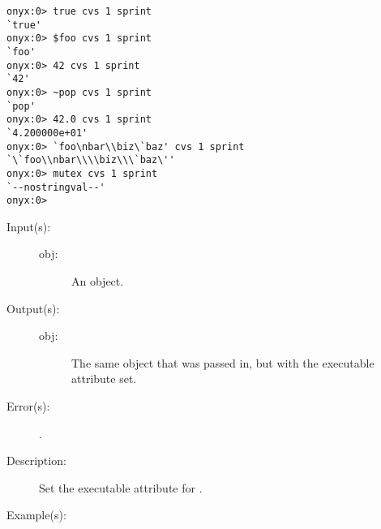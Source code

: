 \begin{description}
\begin{description}
\begin{verbatim}
onyx:0> true cvs 1 sprint
`true'
onyx:0> $foo cvs 1 sprint
`foo'
onyx:0> 42 cvs 1 sprint
`42'
onyx:0> ~pop cvs 1 sprint
`pop'
onyx:0> 42.0 cvs 1 sprint
`4.200000e+01'
onyx:0> `foo\nbar\\biz\`baz' cvs 1 sprint
`\`foo\\nbar\\\\biz\\\`baz\''
onyx:0> mutex cvs 1 sprint
`--nostringval--'
onyx:0>
		\end{verbatim}
	\end{description}
\label{systemdict:cvx}
\item[{\onyxop{obj}{cvx}{obj}}: ]
	\begin{description}\item[]
	\item[Input(s): ]
		\begin{description}\item[]
		\item[obj: ]
			An object.
		\end{description}
	\item[Output(s): ]
		\begin{description}\item[]
		\item[obj: ]
			The same object that was passed in, but with the
			executable attribute set.
		\end{description}
	\item[Error(s): ]
		\begin{description}\item[]
		\item[.]
		\end{description}
	\item[Description: ]
		Set the executable attribute for .
	\item[Example(s): ]\begin{verbatim}


\end{verbatim}
\end{description}
\end{description}
